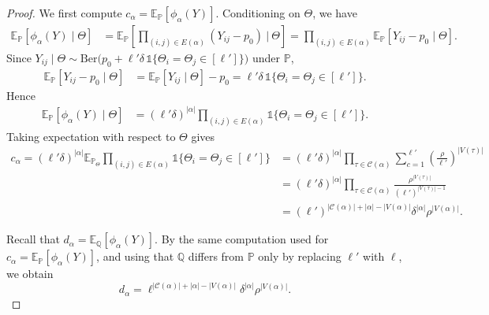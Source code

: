 \documentclass[10pt,a4paper]{amsart}
\newcommand{\E}{\mathbb{E}}
\newcommand{\PP}{\mathbb{P}}
\newcommand{\QQ}{\mathbb{Q}}
\begin{document}
    \begin{proof} We first compute $c_\alpha=\E_\PP[\phi_\alpha(Y)]$. Conditioning on $\Theta$, we have 
\begin{align*} \mathbb E_{\PP}[\phi_\alpha(Y)\mid \Theta] &=\mathbb E_{\PP} \left[\prod_{(i,j)\in E(\alpha)}(Y_{ij}-p_0)\ \Big|\ \Theta\right] =\prod_{(i,j)\in E(\alpha)}\mathbb E_{\PP}[Y_{ij}-p_0\mid \Theta]. \end{align*} Since $Y_{ij}\mid\Theta\sim\mathrm{Ber} \big(p_0+\ell'\delta\,\mathds 1\{\Theta_i=\Theta_j\in[\ell']\}\big)$ under $\PP$,  \begin{align*} \mathbb E_{\PP}[Y_{ij}-p_0\mid\Theta] &=\mathbb E_{\PP}[Y_{ij}\mid\Theta]-p_0 =\ell'\delta\,\mathds 1\{\Theta_i=\Theta_j\in[\ell']\}. \end{align*} 
%
Hence 
\begin{align*}
\E_{\PP}[\phi_\alpha(Y)\mid \Theta]
&=(\ell'\delta)^{|\alpha|}
\prod_{(i,j)\in E(\alpha)}
\mathds 1\{\Theta_i=\Theta_j\in[\ell']\}.
\end{align*}
Taking expectation with respect to $\Theta$ gives
\begin{align*}
c_\alpha=(\ell'\delta)^{|\alpha|} \E_{\PP_\Theta}\prod_{(i,j)\in E(\alpha)} \mathds 1\{\Theta_i=\Theta_j\in[\ell']\}&=(\ell'\delta)^{|\alpha|}\prod_{\tau \in \mathcal{C}(\alpha)}
\sum_{c=1}^{\ell'}\left(\frac{\rho}{\ell'}\right)^{|V(\tau)|}\\
&=(\ell'\delta)^{|\alpha|}\prod_{\tau \in \mathcal{C}(\alpha)}\frac{\rho^{|V(\tau)|}}{(\ell')^{|V(\tau)|-1}}\\
&=(\ell')^{|\mathcal{C}(\alpha)|+|\alpha|-|V(\alpha)|}\delta^{|\alpha|}\rho^{|V(\alpha)|}.
\end{align*}

\noindent Recall that $d_\alpha=\E_\QQ[\phi_\alpha(Y)]$. By the same computation used for $c_\alpha=\E_\PP[\phi_\alpha(Y)]$, and using that $\QQ$ differs from $\PP$ only by replacing $\ell'$ with $\ell$, we obtain
\[d_\alpha=\ell^{|\mathcal{C}(\alpha)|+|\alpha|-|V(\alpha)|}\delta^{|\alpha|}\rho^{|V(\alpha)|}.\]



\end{proof}
\end{document}
